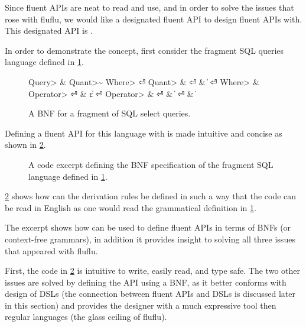 Since fluent APIs are neat to read and use,
  and in order to solve the issues that rose with fluflu,
  we would like a designated fluent API to design fluent APIs with.
This designated API is \Fajita.

In order to demonstrate the concept, first consider the fragment SQL queries
language defined in \cref{figure:sql-bnf}.

\begin{figure}[ht]
  \caption{\label{figure:sql-bnf}
    A BNF for a fragment of SQL select queries.
  }
  \begin{Grammar}
    \begin{aligned}
      \<Query> & \Derives {} \<Quant>\~ \<Where> \hfill⏎
      \<Quant> & \Derives {} \hfill⏎
               & \|  \hfill⏎
      \<Where> & \Derives {}  \<Operator> \hfill⏎
          & \|ε \hfill⏎
      \<Operator> & \Derives {}\hfill⏎
          & \|  \hfill⏎
          & \| \hfill
    \end{aligned}
  \end{Grammar}
\end{figure}

Defining a fluent API for this language with \Fajita is made
intuitive and concise as shown in \cref{figure:sql-bnf-java}.

\begin{figure}[ht]
  \caption{\label{figure:sql-bnf-java}
    A \Java code excerpt defining the BNF specification of the fragment SQL
    language defined in \cref{figure:sql-bnf}.}
\end{figure}

\cref{figure:sql-bnf-java} shows how can the derivation rules be defined in
such a way that the code can be read in English as one would read the
grammatical definition in \cref{figure:sql-bnf}.

The excerpt shows how can \Fajita be used to define fluent
  APIs in terms of BNFs (or context-free grammars), in addition it provides
  insight to solving all three issues that appeared with fluflu.

First, the code in \cref{figure:sql-bnf-java} is intuitive to write, easily
read, and type safe. The two other issues are solved by defining the API using
a BNF, as it better conforms with design of DSLs (the connection between fluent
APIs and DSLs is discussed later in this section) and provides the designer
with a much expressive tool then regular languages (the glass ceiling of
fluflu).

